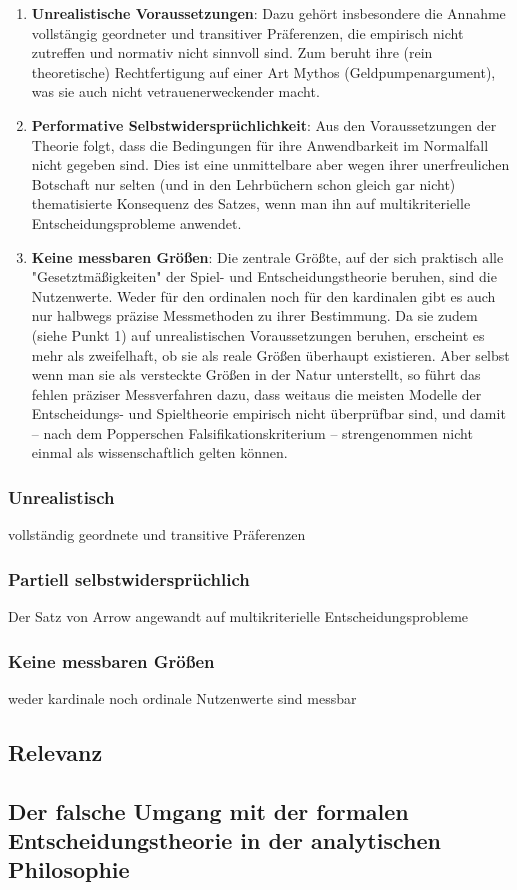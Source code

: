 \begin{enumerate}

\item {\bf Unrealistische Voraussetzungen}: Dazu gehört insbesondere die Annahme
vollstängig geordneter und transitiver Präferenzen, die empirisch nicht
zutreffen und normativ nicht sinnvoll sind. Zum beruht ihre (rein theoretische)
Rechtfertigung auf einer Art Mythos (Geldpumpenargument), was sie auch nicht
vetrauenerweckender macht. 

\item {\bf Performative Selbstwidersprüchlichkeit}: Aus den Voraussetzungen der
Theorie folgt, dass die Bedingungen für ihre Anwendbarkeit im Normalfall nicht
gegeben sind. Dies ist eine unmittelbare aber wegen ihrer unerfreulichen
Botschaft nur selten (und in den Lehrbüchern schon gleich gar nicht)
thematisierte Konsequenz des Satzes, wenn man ihn auf multikriterielle
Entscheidungsprobleme anwendet.

\item {\bf Keine messbaren Größen}: Die zentrale Größte, auf der sich praktisch
alle "Gesetztmäßigkeiten" der Spiel- und Entscheidungstheorie beruhen, sind die
Nutzenwerte. Weder für den ordinalen noch für den kardinalen gibt es auch nur
halbwegs präzise Messmethoden zu ihrer Bestimmung. Da sie zudem (siehe Punkt 1)
auf unrealistischen Voraussetzungen beruhen, erscheint es mehr als zweifelhaft,
ob sie als reale Größen überhaupt existieren. Aber selbst wenn man sie als
versteckte Größen in der Natur unterstellt, so führt das fehlen präziser
Messverfahren dazu, dass weitaus die meisten Modelle der Entscheidungs- und
Spieltheorie empirisch nicht überprüfbar sind, und damit -- nach dem Popperschen Falsifikationskriterium -- strengenommen nicht einmal als wissenschaftlich gelten können. 

\end{enumerate}

\subsubsection{Unrealistisch}

vollständig geordnete und transitive Präferenzen


\subsubsection{Partiell selbstwidersprüchlich}

Der Satz von Arrow angewandt auf multikriterielle Entscheidungsprobleme


\subsubsection{Keine messbaren Größen}

weder kardinale noch ordinale Nutzenwerte sind messbar


\subsection{Relevanz}


\subsection{Der falsche Umgang mit der formalen Entscheidungstheorie in der analytischen Philosophie}
